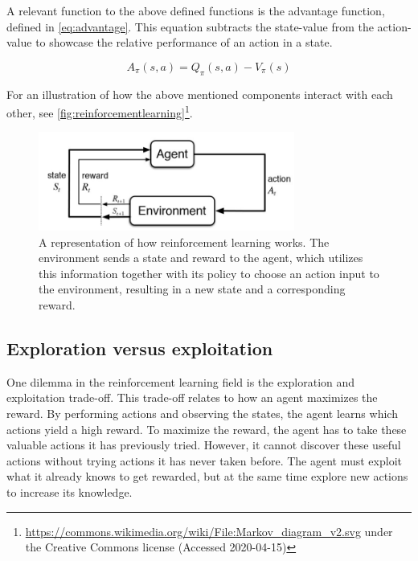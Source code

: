 \documentclass{kththesis}
\begin{document}
A relevant function to the above defined functions is the advantage function, defined in \autoref{eq:advantage}. This equation subtracts the state-value from the action-value to showcase the relative performance of an action in a state. \parencite{wang2015dueling}

\begin{equation}
\label{eq:advantage}
A_\pi(s,a) = Q_\pi(s,a) - V_\pi(s)
\end{equation}

For an illustration of how the above mentioned components interact with each other, see \autoref{fig:reinforcementlearning}\footnote{\url{https://commons.wikimedia.org/wiki/File:Markov_diagram_v2.svg} under the Creative Commons license (Accessed 2020-04-15)}.

\begin{figure}
\centering
\includegraphics[width=0.75\textwidth]{reinforcement-learning.jpg}
\caption{A representation of how reinforcement learning works. The environment sends a state and reward to the agent, which utilizes this information together with its policy to choose an action input to the environment, resulting in a new state and a corresponding reward.}
\label{fig:reinforcementlearning}
\end{figure}

\subsection{Exploration versus exploitation}
\label{subsec:explorevsexploit}
One dilemma in the reinforcement learning field is the exploration and exploitation trade-off. This trade-off relates to how an agent maximizes the reward. By performing actions and observing the states, the agent learns which actions yield a high reward. To maximize the reward, the agent has to take these valuable actions it has previously tried. However, it cannot discover these useful actions without trying actions it has never taken before. The agent must exploit what it already knows to get rewarded, but at the same time explore new actions to increase its knowledge.
\end{document}
